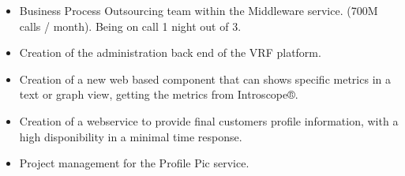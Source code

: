 \documentclass[10pt,a4paper]{altacv}
\begin{document}
\divider

\begin{itemize}
\item Business Process Outsourcing team within the Middleware service. (700M calls / month). Being on call 1 night out of 3.
\end{itemize}
\divider

\begin{itemize}
\item Creation of the administration back end of the VRF platform.
\end{itemize}
\divider

\begin{itemize}
\item Creation of a new web based component that can shows specific metrics in a text or graph view, getting the metrics from Introscope®.
\end{itemize}
\divider

\begin{itemize}
\item Creation of a webservice to provide final customers profile information, with a high disponibility in a minimal time response.
\item Project management for the Profile Pic service.
\end{itemize}


\end{document}
